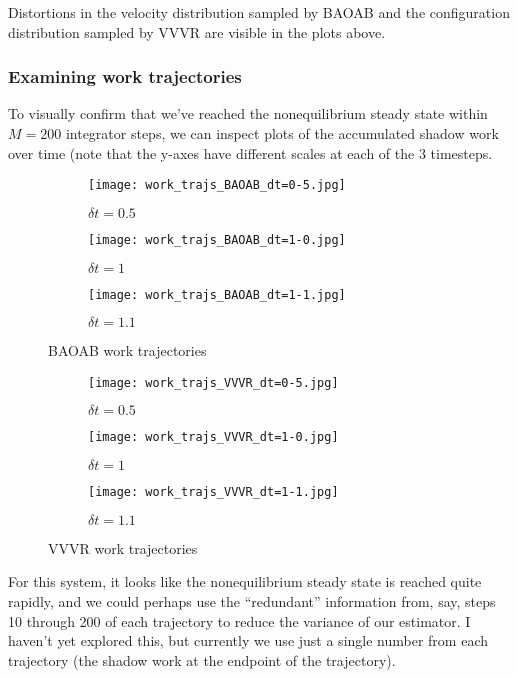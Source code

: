 \documentclass[11pt]{article}
\begin{document}
Distortions in the velocity distribution sampled by BAOAB and the configuration distribution sampled by VVVR are visible in the plots above.


\subsubsection{Examining work trajectories}
To visually confirm that we've reached the nonequilibrium steady state within $M=200$ integrator steps, we can inspect plots of the accumulated shadow work over time (note that the y-axes have different scales at each of the 3 timesteps.
\begin{figure}[h] %
    \centering
    \begin{subfigure}[b]{0.3\textwidth}
        \texttt{[image: work\_trajs\_BAOAB\_dt=0-5.jpg]}
        \caption{$\delta t = 0.5$}
    \end{subfigure}
    \begin{subfigure}[b]{0.3\textwidth}
        \texttt{[image: work\_trajs\_BAOAB\_dt=1-0.jpg]}
        \caption{$\delta t = 1$}
    \end{subfigure}
    \begin{subfigure}[b]{0.3\textwidth}
        \texttt{[image: work\_trajs\_BAOAB\_dt=1-1.jpg]}
        \caption{$\delta t = 1.1$}
    \end{subfigure}
    \caption{BAOAB work trajectories}
\end{figure}

\begin{figure}[h] %
    \centering
    \begin{subfigure}[b]{0.3\textwidth}
        \texttt{[image: work\_trajs\_VVVR\_dt=0-5.jpg]}
        \caption{$\delta t = 0.5$}
    \end{subfigure}
    \begin{subfigure}[b]{0.3\textwidth}
        \texttt{[image: work\_trajs\_VVVR\_dt=1-0.jpg]}
        \caption{$\delta t = 1$}
    \end{subfigure}
    \begin{subfigure}[b]{0.3\textwidth}
        \texttt{[image: work\_trajs\_VVVR\_dt=1-1.jpg]}
        \caption{$\delta t = 1.1$}
    \end{subfigure}
    \caption{VVVR work trajectories}
\end{figure}

For this system, it looks like the nonequilibrium steady state is reached quite rapidly, and we could perhaps use the ``redundant'' information from, say, steps 10 through 200 of each trajectory to reduce the variance of our estimator.
I haven't yet explored this, but currently we use just a single number from each trajectory (the shadow work at the endpoint of the trajectory).
\end{document}
